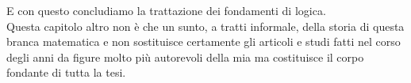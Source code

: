 E con questo concludiamo la trattazione dei fondamenti di logica.\\ 
Questa capitolo altro non è che un sunto, a tratti informale, della storia di questa branca matematica  
e non sostituisce certamente gli articoli e studi fatti nel corso degli anni da figure molto più autorevoli
della mia ma costituisce il corpo fondante di tutta la tesi.




